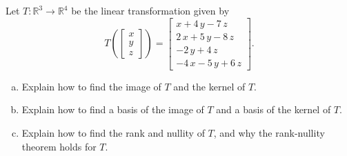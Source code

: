 
\begin{exerciseStatement}
 Let \(T:\mathbb{R}^ 3  \to \mathbb{R}^ 4 \) be the linear transformation given by \[T\left(  \left[\begin{array}{c}
x \\
y \\
z
\end{array}\right]  \right) =  \left[\begin{array}{c}
x + 4 \, y - 7 \, z \\
2 \, x + 5 \, y - 8 \, z \\
-2 \, y + 4 \, z \\
-4 \, x - 5 \, y + 6 \, z
\end{array}\right] .\]
\begin{enumerate}[(a)]
\item Explain how to find the image of \(T\) and the kernel of \(T\).
\item Explain how to find a basis of the image of \(T\) and a basis of the kernel of \(T\).
\item Explain how to find the rank and nullity of \(T\), and why the rank-nullity theorem holds for \(T\).
\end{enumerate}
    
\end{exerciseStatement}
    
